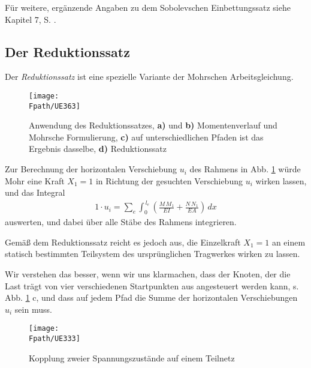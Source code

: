 {{{{{\begin{remark}
F\"{u}r weitere, erg\"{a}nzende Angaben zu dem Sobolevschen Einbettungssatz siehe Kapitel 7, S. \pageref{Eq71}.
\end{remark}

\textcolor{sectionTitleBlue}{\section{Der Reduktionssatz}}\label{RedSatz}
Der {\em Reduktionssatz\/} ist eine spezielle Variante der Mohrschen Arbeitsgleichung.
\begin{figure}[tbp]
\centering
\if {} \sidecaption[t] \fi
\texttt{[image: \\Fpath/UE363]}
\caption{Anwendung des Reduktionssatzes, \textbf{ a)} und \textbf{ b)} Momentenverlauf und Mohrsche Formulierung, \textbf{ c)} auf unterschiedlichen Pfaden ist das Ergebnis dasselbe, \textbf{ d)}  Reduktionssatz} \label{UE363}
\end{figure}%
Zur Berechnung der horizontalen Verschiebung $u_i$ des Rahmens in Abb. \ref{UE363} w\"{u}rde Mohr eine Kraft $X_1 = 1$ in Richtung der gesuchten Verschiebung $u_i$ wirken lassen, und das Integral
\begin{align}
1 \cdot u_i = \sum_e \int_0^{\,l_e} (\frac{M\,M_1}{EI} + \frac{N\,N_1}{EA})\,dx
\end{align}
auswerten, und dabei \"{u}ber alle St\"{a}be des Rahmens integrieren.

Gem\"{a}{\ss} dem Reduktionssatz reicht es jedoch aus, die Einzelkraft $X_1 = 1$ an einem statisch bestimmten Teilsystem des urspr\"{u}nglichen Tragwerkes wirken zu lassen.

Wir verstehen das besser, wenn wir uns klarmachen, dass der Knoten, der die Last tr\"{a}gt von vier verschiedenen Startpunkten aus angesteuert werden kann, s. Abb. \ref{UE363} c, und dass auf jedem Pfad die Summe der horizontalen Verschiebungen $u_i$ sein muss.
\begin{figure}[tbp]
\centering
\if {} \sidecaption[t] \fi
\texttt{[image: \\Fpath/UE333]}
\caption{Kopplung zweier Spannungszust\"{a}nde auf einem Teilnetz} \label{UE333}
\end{figure}%

}}}}}
